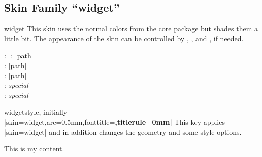 \begin{dispExample}
\end{dispExample}



\clearpage
\subsection{Skin Family \enquote{widget}}
\begin{docSkin}{widget}
  This skin uses the normal colors from the core package but shades
  them a little bit.
  The appearance of the skin can be controlled by ,
  , and ,
  if needed.
\begin{tcolorbox}[skintable=widget]
  \begin{tabbing}
    : \=\kill
    :           \> |path|\\
    : \> |path|\\ 
    :        \> |path|\\
    :    \> \emph{special}\\
    :           \> \emph{special}
  \end{tabbing}
\end{tcolorbox}
\end{docSkin}


\begin{docTcbKey}[][doc updated={2020-09-23}]{widget}{}{style, initially\\
  |skin=widget,arc=0.5mm,fonttitle=\bfseries,titlerule=0mm|
}
  This key applies |skin=widget| and in addition changes the geometry and some style options.
\end{docTcbKey}


\begin{dispExample}
\end{dispExample}


\begin{dispExample}
\begin{tcolorbox}[widget,colback=Salmon!50!white,colframe=FireBrick!75!black,
  adjusted title=A colored box with the \enquote{widget} skin]
This is my content.
\end{tcolorbox}
\end{dispExample}


